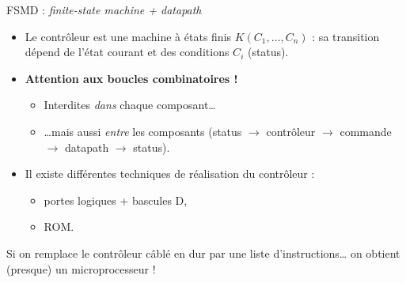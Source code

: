 \begin{frame}{\og FSMD \fg{} : \emph{finite-state machine + datapath}}
  \begin{itemize}
    \item Le contr\^oleur est une machine \`a \'etats finis $K(C_1,\dots,C_n)$ : sa transition d\'epend de l'\'etat courant et des conditions $C_i$ (status).
    \item \textbf{Attention aux boucles combinatoires !}
    \begin{itemize}
      \item Interdites \emph{dans} chaque composant\dots
      \item \dots mais aussi \emph{entre} les composants (status $\to$ contr\^oleur $\to$ commande $\to$ datapath $\to$ status).
    \end{itemize}
    \item Il existe diff\'erentes techniques de r\'ealisation du contr\^oleur :
    \begin{itemize}
      \item portes logiques + bascules D,
      \item ROM.
    \end{itemize}
  \end{itemize}
  \begin{alertblock}{}
    Si on remplace le contr\^oleur c\^abl\'e \og en dur \fg{} par une liste d'instructions\dots{} on obtient (presque) un microprocesseur !
  \end{alertblock}
\end{frame}

